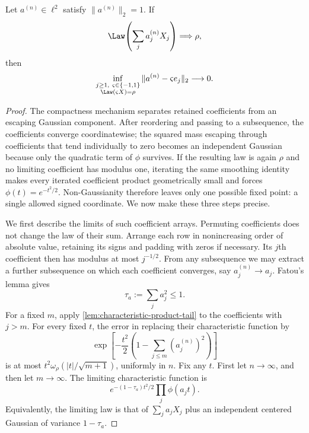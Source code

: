 \begin{lemma}
\label{lem:unit-row-rigidity}
Let $a^{(n)}\in\ell^2$ satisfy $\|a^{(n)}\|_2=1$.  If
\[
 \Law\!\left(\sum_j a_j^{(n)}X_j\right)
       \Longrightarrow\rho,
\]
then
\begin{equation}
 \inf_{\substack{j\geq1,\ \varsigma\in\{-1,1\}\\
                  \Law(\varsigma X)=\rho}}
       \|a^{(n)}-\varsigma e_j\|_2\longrightarrow0.
 \label{eq:unit-row-qualitative}
\end{equation}
\end{lemma}
\begin{proof}
The compactness mechanism separates retained coefficients from an escaping
Gaussian component.  After reordering and passing to a subsequence, the
coefficients converge coordinatewise; the squared mass escaping
through coefficients that tend individually to zero becomes an independent
Gaussian because only the quadratic term of \(\phi\) survives.  If the
resulting law is again \(\rho\) and no limiting coefficient has modulus one,
iterating the same smoothing identity makes every iterated coefficient product
geometrically small and forces \(\phi(t)=e^{-t^2/2}\).  Non-Gaussianity
therefore leaves only one possible fixed point: a single allowed signed
coordinate.  We now make these three steps precise.

We first describe the limits of such coefficient arrays.  Permuting
coefficients does not change the law of their sum.  Arrange each row in
nonincreasing order of absolute value, retaining its signs and padding
with zeros if necessary.  Its $j$th coefficient then has modulus at most
$j^{-1/2}$.  From any subsequence we may extract a further subsequence
on which each coefficient converges, say $a_j^{(n)}\to a_j$.
Fatou's lemma gives
\[
 \tau_a:=\sum_j a_j^2\leq1.
\]
For a fixed $m$, apply
\cref{lem:characteristic-product-tail} to the coefficients with
$j>m$.  For every fixed $t$, the error in replacing their characteristic
function by
\[
 \exp\!\left[-\frac{t^2}{2}
        \left(1-\sum_{j\leq m}(a_j^{(n)})^2\right)\right]
\]
is at most
$t^2\omega_\rho(|t|/\sqrt{m+1})$, uniformly in $n$.
Fix any $t$.
First let $n\to\infty$, and then let $m\to\infty$.
The limiting characteristic function is
\begin{equation}
 e^{-(1-\tau_a)t^2/2}\prod_j\phi(a_jt).
 \label{eq:unit-row-gaussian-summand}
\end{equation}
Equivalently, the limiting law is that of $\sum_j a_jX_j$ plus an
independent centered Gaussian of variance $1-\tau_a$.


\end{proof}
